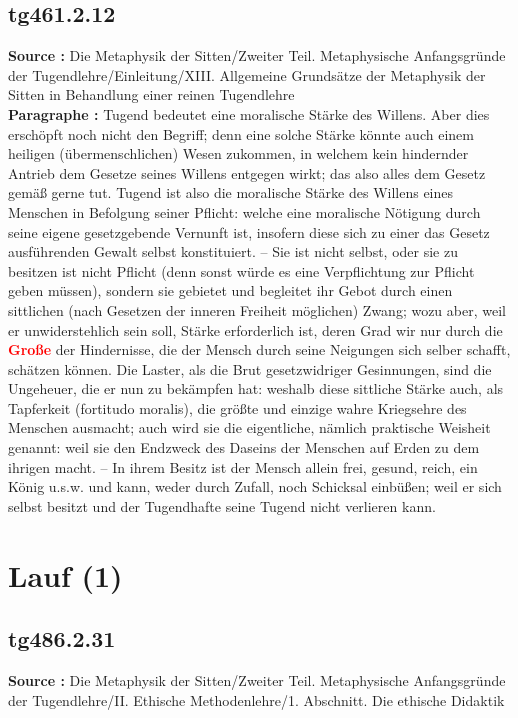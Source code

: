 \documentclass[a4paper,12pt,twoside]{book}
\newcommand{\match}[1]{\textcolor{red}{\textbf{#1}}}
\newcommand{\unnumberedsection}[1]{
	\section*{#1}
	\addcontentsline{toc}{section}{#1}
	\markright{#1}
}
\begin{document}
	\subsection*{tg461.2.12} 
	\textbf{Source : }Die Metaphysik der Sitten/Zweiter Teil. Metaphysische Anfangsgründe der Tugendlehre/Einleitung/XIII. Allgemeine Grundsätze der Metaphysik der Sitten in Behandlung einer reinen Tugendlehre\\  
	
	\textbf{Paragraphe : }Tugend bedeutet eine moralische Stärke des Willens. Aber dies erschöpft noch nicht den Begriff; denn eine solche Stärke könnte auch einem heiligen (übermenschlichen) Wesen zukommen, in welchem kein hindernder Antrieb dem Gesetze seines Willens entgegen wirkt; das also alles dem Gesetz gemäß gerne tut. Tugend ist also die moralische Stärke des Willens eines Menschen in Befolgung seiner Pflicht: welche eine moralische Nötigung durch seine eigene gesetzgebende Vernunft ist, insofern diese sich zu einer das Gesetz ausführenden Gewalt selbst konstituiert. – Sie ist nicht selbst, oder sie zu besitzen ist nicht Pflicht (denn sonst würde es eine Verpflichtung zur Pflicht geben müssen), sondern sie gebietet und begleitet ihr Gebot durch einen sittlichen (nach Gesetzen der inneren Freiheit möglichen) Zwang; wozu aber, weil er unwiderstehlich sein soll, Stärke erforderlich ist, deren Grad wir nur durch die \match{Große} der Hindernisse, die der Mensch durch seine Neigungen sich selber schafft, schätzen können. Die Laster, als die Brut gesetzwidriger Gesinnungen, sind die Ungeheuer, die er nun zu bekämpfen hat: weshalb diese sittliche Stärke auch, als Tapferkeit (fortitudo moralis), die größte und einzige wahre Kriegsehre des Menschen ausmacht; auch wird sie die eigentliche, nämlich praktische Weisheit genannt: weil sie den Endzweck des Daseins der Menschen auf Erden zu dem ihrigen macht. – In ihrem Besitz ist der Mensch allein frei, gesund, reich, ein König u.s.w. und kann, weder durch Zufall, noch Schicksal einbüßen; weil er sich selbst besitzt und der Tugendhafte seine Tugend nicht verlieren kann. 
	
	\unnumberedsection{Lauf (1)} 
	\subsection*{tg486.2.31} 
	\textbf{Source : }Die Metaphysik der Sitten/Zweiter Teil. Metaphysische Anfangsgründe der Tugendlehre/II. Ethische Methodenlehre/1. Abschnitt. Die ethische Didaktik\\  
	
\end{document}
